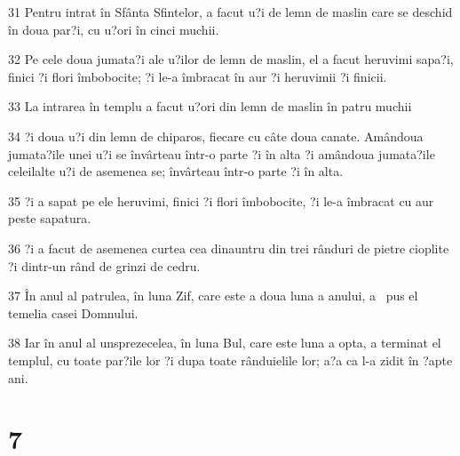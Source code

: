\par 31 Pentru intrat în Sfânta Sfintelor, a facut u?i de lemn de maslin care se deschid în doua par?i, cu u?ori în cinci muchii.
\par 32 Pe cele doua jumata?i ale u?ilor de lemn de maslin, el a facut heruvimi sapa?i, finici ?i flori îmbobocite; ?i le-a îmbracat în aur ?i heruvimii ?i finicii.
\par 33 La intrarea în templu a facut u?ori din lemn de maslin în patru muchii
\par 34 ?i doua u?i din lemn de chiparos, fiecare cu câte doua canate. Amândoua jumata?ile unei u?i se învârteau într-o parte ?i în alta ?i amândoua jumata?ile celeilalte u?i de asemenea se; învârteau într-o parte ?i în alta.
\par 35 ?i a sapat pe ele heruvimi, finici ?i flori îmbobocite, ?i le-a îmbracat cu aur peste sapatura.
\par 36 ?i a facut de asemenea curtea cea dinauntru din trei rânduri de pietre cioplite ?i dintr-un rând de grinzi de cedru.
\par 37 În anul al patrulea, în luna Zif, care este a doua luna a anului, a  pus el temelia casei Domnului.
\par 38 Iar în anul al unsprezecelea, în luna Bul, care este luna a opta, a terminat el templul, cu toate par?ile lor ?i dupa toate rânduielile lor; a?a ca l-a zidit în ?apte ani.

\chapter{7}

